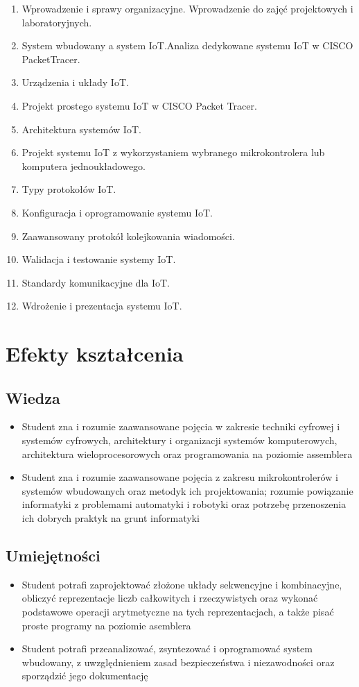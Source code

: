 \documentclass[12pt, a4paper]{article}
\begin{document}
\begin{enumerate}
  \item Wprowadzenie i sprawy organizacyjne. Wprowadzenie do zajęć projektowych i laboratoryjnych.
  \item System wbudowany a system IoT.Analiza dedykowane systemu IoT w  CISCO PacketTracer.
  \item Urządzenia i układy IoT.
  \item Projekt prostego systemu IoT w CISCO Packet Tracer.
  \item Architektura systemów IoT.
  \item Projekt systemu IoT z wykorzystaniem wybranego mikrokontrolera lub komputera jednoukładowego.
  \item Typy protokołów IoT.
  \item Konfiguracja i oprogramowanie systemu IoT.
  \item Zaawansowany protokół kolejkowania wiadomości.
  \item Walidacja i testowanie systemy IoT.
  \item Standardy komunikacyjne dla IoT.
  \item Wdrożenie i prezentacja systemu IoT.
\end{enumerate}

\section{Efekty kształcenia}

\subsection*{Wiedza}
\begin{itemize}
  \item Student zna i rozumie zaawansowane pojęcia w zakresie techniki cyfrowej i systemów cyfrowych, architektury i organizacji systemów komputerowych, architektura wieloprocesorowych oraz programowania na poziomie assemblera
  \item Student zna i rozumie zaawansowane pojęcia z zakresu mikrokontrolerów i systemów wbudowanych oraz metodyk ich projektowania; rozumie powiązanie informatyki z problemami automatyki i robotyki oraz potrzebę przenoszenia ich dobrych praktyk na grunt informatyki
\end{itemize}

\subsection*{Umiejętności}
\begin{itemize}
  \item Student potrafi zaprojektować złożone układy sekwencyjne i kombinacyjne, obliczyć reprezentacje liczb całkowitych i rzeczywistych oraz wykonać podstawowe operacji arytmetyczne na tych reprezentacjach, a także pisać proste programy na poziomie asemblera
  \item Student potrafi przeanalizować, zsyntezować i oprogramować system wbudowany, z uwzględnieniem zasad bezpieczeństwa i niezawodności oraz sporządzić jego dokumentację
\end{itemize}
\end{document}

